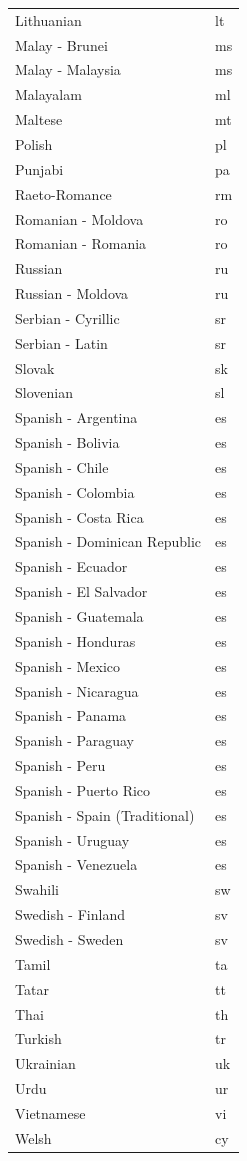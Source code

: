 \documentclass[
  12pt,
]{krantz}
\begin{document}
\begin{longtable}[t]{ll}
Lithuanian & lt\\
Malay - Brunei & ms\\
\addlinespace
Malay - Malaysia & ms\\
Malayalam & ml\\
Maltese & mt\\
Polish & pl\\
Punjabi & pa\\
\addlinespace
Raeto-Romance & rm\\
Romanian - Moldova & ro\\
Romanian - Romania & ro\\
Russian & ru\\
Russian - Moldova & ru\\
\addlinespace
Serbian - Cyrillic & sr\\
Serbian - Latin & sr\\
Slovak & sk\\
Slovenian & sl\\
Spanish - Argentina & es\\
\addlinespace
Spanish - Bolivia & es\\
Spanish - Chile & es\\
Spanish - Colombia & es\\
Spanish - Costa Rica & es\\
Spanish - Dominican Republic & es\\
\addlinespace
Spanish - Ecuador & es\\
Spanish - El Salvador & es\\
Spanish - Guatemala & es\\
Spanish - Honduras & es\\
Spanish - Mexico & es\\
\addlinespace
Spanish - Nicaragua & es\\
Spanish - Panama & es\\
Spanish - Paraguay & es\\
Spanish - Peru & es\\
Spanish - Puerto Rico & es\\
\addlinespace
Spanish - Spain (Traditional) & es\\
Spanish - Uruguay & es\\
Spanish - Venezuela & es\\
Swahili & sw\\
Swedish - Finland & sv\\
\addlinespace
Swedish - Sweden & sv\\
Tamil & ta\\
Tatar & tt\\
Thai & th\\
Turkish & tr\\
\addlinespace
Ukrainian & uk\\
Urdu & ur\\
Vietnamese & vi\\
Welsh & cy\\*
\end{longtable}
\end{document}
